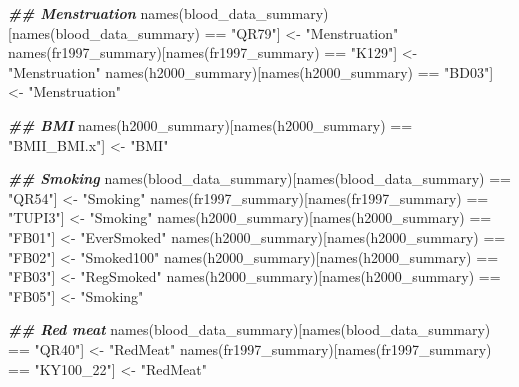 \documentclass[
]{article}
\newenvironment{Shaded}{\begin{snugshade}}{\end{snugshade}}
\newcommand{\DocumentationTok}[1]{\textcolor[rgb]{0.56,0.35,0.01}{\textbf{\textit{#1}}}}
\newcommand{\FunctionTok}[1]{\textcolor[rgb]{0.00,0.00,0.00}{#1}}
\newcommand{\NormalTok}[1]{#1}
\newcommand{\OtherTok}[1]{\textcolor[rgb]{0.56,0.35,0.01}{#1}}
\newcommand{\SpecialCharTok}[1]{\textcolor[rgb]{0.00,0.00,0.00}{#1}}
\newcommand{\StringTok}[1]{\textcolor[rgb]{0.31,0.60,0.02}{#1}}
\begin{document}
\begin{Shaded}
\begin{Highlighting}[]
\DocumentationTok{\#\# Menstruation}
\FunctionTok{names}\NormalTok{(blood\_data\_summary)[}\FunctionTok{names}\NormalTok{(blood\_data\_summary) }\SpecialCharTok{==} \StringTok{"QR79"}\NormalTok{] }\OtherTok{\textless{}{-}} \StringTok{"Menstruation"}
\FunctionTok{names}\NormalTok{(fr1997\_summary)[}\FunctionTok{names}\NormalTok{(fr1997\_summary) }\SpecialCharTok{==} \StringTok{"K129"}\NormalTok{] }\OtherTok{\textless{}{-}} \StringTok{"Menstruation"}
\FunctionTok{names}\NormalTok{(h2000\_summary)[}\FunctionTok{names}\NormalTok{(h2000\_summary) }\SpecialCharTok{==} \StringTok{"BD03"}\NormalTok{] }\OtherTok{\textless{}{-}} \StringTok{"Menstruation"}

\DocumentationTok{\#\# BMI}
\FunctionTok{names}\NormalTok{(h2000\_summary)[}\FunctionTok{names}\NormalTok{(h2000\_summary) }\SpecialCharTok{==} \StringTok{"BMII\_BMI.x"}\NormalTok{] }\OtherTok{\textless{}{-}} \StringTok{"BMI"}

\DocumentationTok{\#\# Smoking}
\FunctionTok{names}\NormalTok{(blood\_data\_summary)[}\FunctionTok{names}\NormalTok{(blood\_data\_summary) }\SpecialCharTok{==} \StringTok{"QR54"}\NormalTok{] }\OtherTok{\textless{}{-}} \StringTok{"Smoking"}
\FunctionTok{names}\NormalTok{(fr1997\_summary)[}\FunctionTok{names}\NormalTok{(fr1997\_summary) }\SpecialCharTok{==} \StringTok{"TUPI3"}\NormalTok{] }\OtherTok{\textless{}{-}} \StringTok{"Smoking"}
\FunctionTok{names}\NormalTok{(h2000\_summary)[}\FunctionTok{names}\NormalTok{(h2000\_summary) }\SpecialCharTok{==} \StringTok{"FB01"}\NormalTok{] }\OtherTok{\textless{}{-}} \StringTok{"EverSmoked"}
\FunctionTok{names}\NormalTok{(h2000\_summary)[}\FunctionTok{names}\NormalTok{(h2000\_summary) }\SpecialCharTok{==} \StringTok{"FB02"}\NormalTok{] }\OtherTok{\textless{}{-}} \StringTok{"Smoked100"}
\FunctionTok{names}\NormalTok{(h2000\_summary)[}\FunctionTok{names}\NormalTok{(h2000\_summary) }\SpecialCharTok{==} \StringTok{"FB03"}\NormalTok{] }\OtherTok{\textless{}{-}} \StringTok{"RegSmoked"}
\FunctionTok{names}\NormalTok{(h2000\_summary)[}\FunctionTok{names}\NormalTok{(h2000\_summary) }\SpecialCharTok{==} \StringTok{"FB05"}\NormalTok{] }\OtherTok{\textless{}{-}} \StringTok{"Smoking"}

\DocumentationTok{\#\# Red meat}
\FunctionTok{names}\NormalTok{(blood\_data\_summary)[}\FunctionTok{names}\NormalTok{(blood\_data\_summary) }\SpecialCharTok{==} \StringTok{"QR40"}\NormalTok{] }\OtherTok{\textless{}{-}} \StringTok{"RedMeat"}
\FunctionTok{names}\NormalTok{(fr1997\_summary)[}\FunctionTok{names}\NormalTok{(fr1997\_summary) }\SpecialCharTok{==} \StringTok{"KY100\_22"}\NormalTok{] }\OtherTok{\textless{}{-}} \StringTok{"RedMeat"}


\end{Highlighting}
\end{Shaded}
\end{document}
